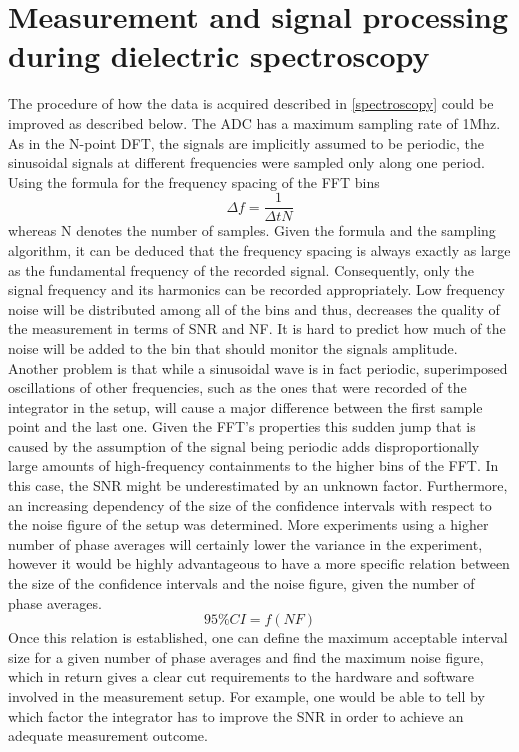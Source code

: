 \section{Measurement and signal processing during dielectric spectroscopy}
The procedure of how the data is acquired described in \ref{spectroscopy}
could be improved as described below. The ADC has a maximum sampling rate of
1Mhz. As in the N-point DFT, the signals are implicitly assumed to be periodic,
the sinusoidal signals at different frequencies were sampled only along one period.
Using the formula for the frequency spacing of the FFT bins
\begin{equation}
 \Delta f=\frac{1}{\Delta t N}
\end{equation}
whereas N denotes the number of samples. 
Given the formula and the sampling algorithm, it can be deduced that the frequency spacing is
always exactly as large as the fundamental frequency of the recorded signal.
Consequently, only the signal frequency and its harmonics can be recorded appropriately.
Low frequency noise will be distributed among all of the bins and thus, decreases
the quality of the measurement in terms of SNR and NF. It is hard to predict how much of the noise will be added to the bin that should
monitor the signals amplitude. 
Another problem is that while a sinusoidal wave is in fact periodic, superimposed oscillations of other frequencies, such as the ones that
were recorded of the integrator in the setup, will cause a major difference between the first sample point and the last one. 
Given the FFT's properties this sudden jump that is caused by the assumption of the signal being periodic adds
disproportionally large amounts of high-frequency containments to the higher bins of the FFT. In this case, the SNR might be underestimated by an unknown factor. 
\newline
Furthermore, an increasing dependency of the size of the confidence intervals with respect to the noise figure of
the setup was determined. 
More experiments using a higher number of phase averages will certainly lower the variance in the experiment, however it would 
be highly advantageous to have a more specific relation between the size of the confidence intervals
and the noise figure, given the number of phase averages.
\begin{equation}
 95 \% CI=f\left(NF\right)
\end{equation}
Once this relation is established, one can define the maximum acceptable
interval size for a given number of phase averages and find the maximum noise figure, 
which in return gives a clear cut requirements to the hardware and software involved in the measurement setup.
For example, one would be able to tell by which factor the integrator has to improve the SNR in order to achieve
an adequate measurement outcome.


